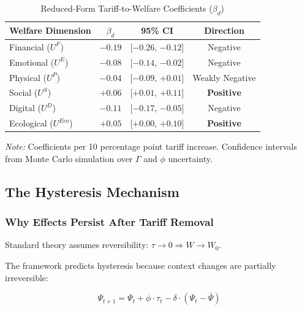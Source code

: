 \begin{table}[htbp]
\centering
\caption{Reduced-Form Tariff-to-Welfare Coefficients ($\beta_d$)}
\label{tab:beta-coefficients}
\begin{tabular}{@{}lccc@{}}
\toprule
\textbf{Welfare Dimension} & \textbf{$\beta_d$} & \textbf{95\% CI} & \textbf{Direction} \\
\midrule
Financial ($U^F$) & $-0.19$ & [$-0.26$, $-0.12$] & Negative \\
Emotional ($U^E$) & $-0.08$ & [$-0.14$, $-0.02$] & Negative \\
Physical ($U^P$) & $-0.04$ & [$-0.09$, $+0.01$] & Weakly Negative \\
Social ($U^S$) & $+0.06$ & [$+0.01$, $+0.11$] & \textbf{Positive} \\
Digital ($U^D$) & $-0.11$ & [$-0.17$, $-0.05$] & Negative \\
Ecological ($U^{Eco}$) & $+0.05$ & [$+0.00$, $+0.10$] & \textbf{Positive} \\
\bottomrule
\end{tabular}
\begin{flushleft}
\small\textit{Note:} Coefficients per 10 percentage point tariff increase. Confidence intervals from Monte Carlo simulation over $\Gamma$ and $\phi$ uncertainty.
\end{flushleft}
\end{table}

\subsection{The Hysteresis Mechanism}

\subsubsection{Why Effects Persist After Tariff Removal}

Standard theory assumes reversibility: $\tau \to 0 \Rightarrow W \to W_0$.

The framework predicts hysteresis because context changes are partially irreversible:

\begin{equation}
\Psi_{t+1} = \Psi_t + \phi \cdot \tau_t - \delta \cdot (\Psi_t - \bar{\Psi})
\label{eq:psi-dynamics}
\end{equation}

